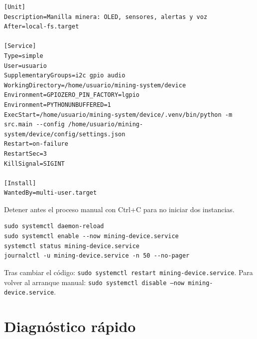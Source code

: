 \documentclass[11pt,a4paper]{article}
\begin{document}
\begin{lstlisting}
[Unit]
Description=Manilla minera: OLED, sensores, alertas y voz
After=local-fs.target

[Service]
Type=simple
User=usuario
SupplementaryGroups=i2c gpio audio
WorkingDirectory=/home/usuario/mining-system/device
Environment=GPIOZERO_PIN_FACTORY=lgpio
Environment=PYTHONUNBUFFERED=1
ExecStart=/home/usuario/mining-system/device/.venv/bin/python -m src.main --config /home/usuario/mining-system/device/config/settings.json
Restart=on-failure
RestartSec=3
KillSignal=SIGINT

[Install]
WantedBy=multi-user.target
\end{lstlisting}

Detener antes el proceso manual con Ctrl+C para no iniciar dos instancias.

\begin{lstlisting}
sudo systemctl daemon-reload
sudo systemctl enable --now mining-device.service
systemctl status mining-device.service
journalctl -u mining-device.service -n 50 --no-pager
\end{lstlisting}

Tras cambiar el código: \texttt{sudo systemctl restart mining-device.service}.
Para volver al arranque manual:
\texttt{sudo systemctl disable --now mining-device.service}.

\section{Diagnóstico rápido}
\end{document}
